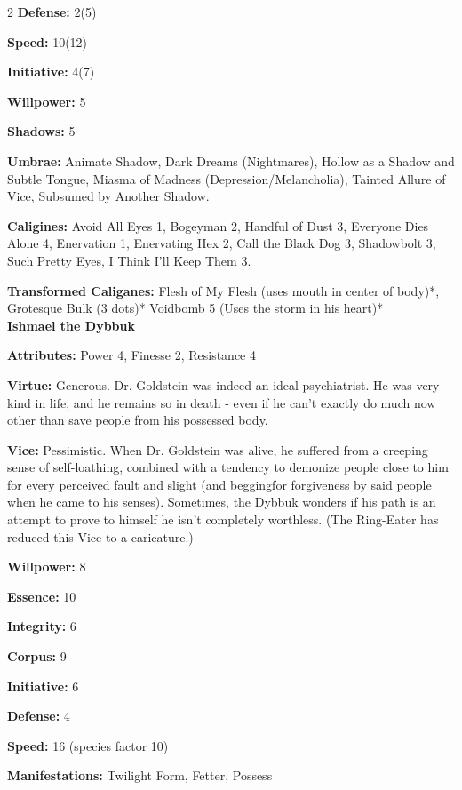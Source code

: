 \begin{multicols}{2}
\noindent \textbf{Defense:} 2(5)

\noindent \textbf{Speed:} 10(12)

\noindent \textbf{Initiative:} 4(7)

\noindent \textbf{Willpower:} 5

\noindent \textbf{Shadows:} 5

\noindent \textbf{Umbrae:} Animate Shadow, Dark Dreams (Nightmares), Hollow as a Shadow and Subtle Tongue, Miasma of Madness (Depression/Melancholia), Tainted Allure of Vice, Subsumed by Another Shadow.

\noindent \textbf{Caligines:} Avoid All Eyes 1, Bogeyman 2, Handful of Dust 3, Everyone Dies Alone 4, Enervation 1, Enervating Hex 2, Call the Black Dog 3, Shadowbolt 3, Such Pretty Eyes, I Think I'll Keep Them 3.

\noindent \textbf{Transformed Caliganes:} Flesh of My Flesh (uses mouth in center of body)*, Grotesque Bulk (3 dots)* Voidbomb 5 (Uses the storm in his heart)* \\ 

\noindent \textbf{Ishmael the Dybbuk}

\noindent \textbf{Attributes:} Power 4, Finesse 2, Resistance 4

\noindent \textbf{Virtue:} Generous. Dr. Goldstein was indeed an ideal psychiatrist. He was very kind in life, and he remains so in death - even if he can’t exactly do much now other than save people from his possessed body.

\noindent \textbf{Vice:} Pessimistic. When Dr. Goldstein was alive, he suffered from a creeping sense of self-loathing, combined with a tendency to demonize people close to him for every perceived fault and slight (and beggingfor forgiveness by said people when he came to his senses). Sometimes, the Dybbuk wonders if his path is an attempt to prove to himself he isn’t completely worthless. (The Ring-Eater has reduced this Vice to a caricature.)

\noindent \textbf{Willpower:} 8

\noindent \textbf{Essence:} 10

\noindent \textbf{Integrity:} 6

\noindent \textbf{Corpus:} 9

\noindent \textbf{Initiative:} 6

\noindent \textbf{Defense:} 4

\noindent \textbf{Speed:} 16 (species factor 10)

\noindent \textbf{Manifestations:} Twilight Form, Fetter, Possess


\end{multicols}

